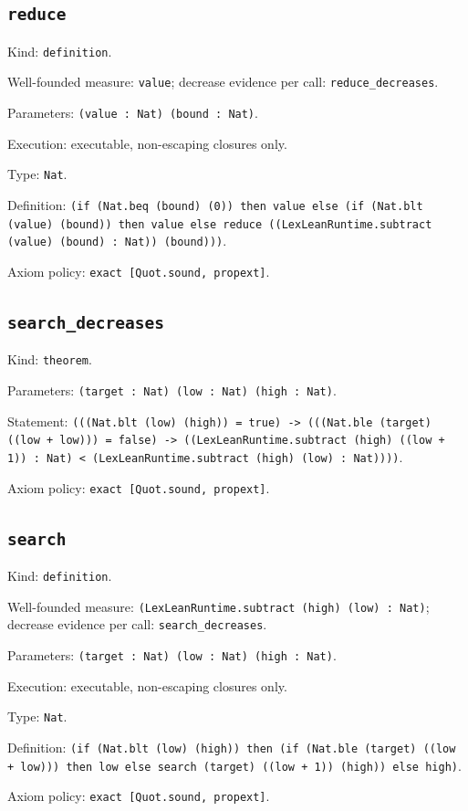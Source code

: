 \documentclass[11pt]{article}
\begin{document}
\subsection*{\texttt{reduce}}
\noindent Kind: \texttt{definition}.\par
\noindent Well-founded measure: \texttt{value}; decrease evidence per call: \texttt{reduce\_decreases}.\par
\noindent Parameters: \texttt{(value : Nat) (bound : Nat)}.\par
\noindent Execution: executable, non-escaping closures only.\par
\noindent Type: \texttt{Nat}.\par
\noindent Definition: \texttt{(if (Nat.beq (bound) (0)) then value else (if (Nat.blt (value) (bound)) then value else reduce ((LexLeanRuntime.subtract (value) (bound) : Nat)) (bound)))}.\par
\noindent Axiom policy: \texttt{exact [Quot.sound, propext]}.\par
\subsection*{\texttt{search\_decreases}}
\noindent Kind: \texttt{theorem}.\par
\noindent Parameters: \texttt{(target : Nat) (low : Nat) (high : Nat)}.\par
\noindent Statement: \texttt{(((Nat.blt (low) (high)) = true) -> (((Nat.ble (target) ((low + low))) = false) -> ((LexLeanRuntime.subtract (high) ((low + 1)) : Nat) < (LexLeanRuntime.subtract (high) (low) : Nat))))}.\par
\noindent Axiom policy: \texttt{exact [Quot.sound, propext]}.\par
\subsection*{\texttt{search}}
\noindent Kind: \texttt{definition}.\par
\noindent Well-founded measure: \texttt{(LexLeanRuntime.subtract (high) (low) : Nat)}; decrease evidence per call: \texttt{search\_decreases}.\par
\noindent Parameters: \texttt{(target : Nat) (low : Nat) (high : Nat)}.\par
\noindent Execution: executable, non-escaping closures only.\par
\noindent Type: \texttt{Nat}.\par
\noindent Definition: \texttt{(if (Nat.blt (low) (high)) then (if (Nat.ble (target) ((low + low))) then low else search (target) ((low + 1)) (high)) else high)}.\par
\noindent Axiom policy: \texttt{exact [Quot.sound, propext]}.\par
\end{document}
